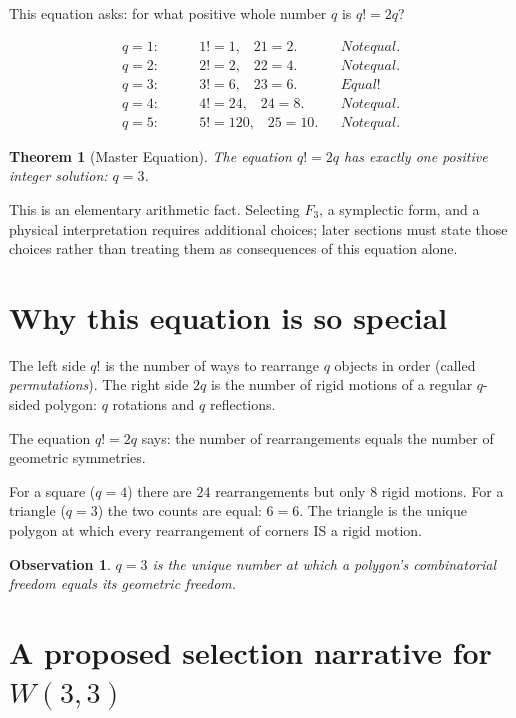 \documentclass[11pt]{article}
\def\mathbb#1{#1}%
\def\textbf#1{#1}%
\def\text#1{#1}%
\def\cdot{ }%
\newtheorem*{theorem}{Theorem}
\newtheorem*{observation}{Observation}
\begin{document}
This equation asks: for what positive whole number $q$ is $q! = 2q$?

\begin{align*}
q = 1: \quad &\quad 1! = 1, \;\;\; 2 \cdot 1 = 2. && \text{Not equal.} \\
q = 2: \quad &\quad 2! = 2, \;\;\; 2 \cdot 2 = 4. && \text{Not equal.} \\
q = 3: \quad &\quad 3! = 6, \;\;\; 2 \cdot 3 = 6. && \textbf{Equal!} \\
q = 4: \quad &\quad 4! = 24, \;\;\; 2 \cdot 4 = 8. && \text{Not equal.} \\
q = 5: \quad &\quad 5! = 120, \;\;\; 2 \cdot 5 = 10. && \text{Not equal.}
\end{align*}

\begin{theorem}[Master Equation]
The equation $q! = 2q$ has exactly one positive integer solution: $q = 3$.
\end{theorem}

This is an elementary arithmetic fact.  Selecting $\mathbb{F}_3$, a symplectic form, and a physical interpretation requires additional choices; later sections must state those choices rather than treating them as consequences of this equation alone.

\section{Why this equation is so special}

The left side $q!$ is the number of ways to rearrange $q$ objects in order (called \emph{permutations}). The right side $2q$ is the number of rigid motions of a regular $q$-sided polygon: $q$ rotations and $q$ reflections.

The equation $q! = 2q$ says: \textbf{the number of rearrangements equals the number of geometric symmetries.}

For a square ($q = 4$) there are $24$ rearrangements but only $8$ rigid motions. For a triangle ($q = 3$) the two counts are equal: $6 = 6$. The triangle is the unique polygon at which every rearrangement of corners IS a rigid motion.

\begin{observation}
$q = 3$ is the unique number at which a polygon's combinatorial freedom equals its geometric freedom.
\end{observation}

\section{\texorpdfstring{A proposed selection narrative for $W(3,3)$}{A proposed selection narrative for W(3,3)}}
\end{document}
